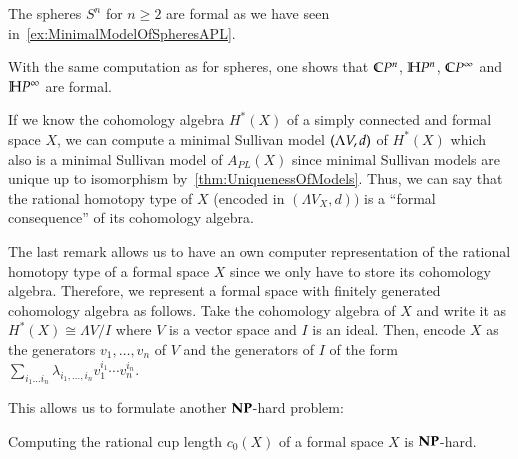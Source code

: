 \begin{Example}
 The spheres $S^n$ for $n \geq 2$ are formal as we have seen in~\ref{ex:MinimalModelOfSpheresAPL}. 
\end{Example}

\begin{Example}
With the same computation as for spheres, one shows that $\mathbb{C} P^n$, $\mathbb{H} P^n$,
$\mathbb{C} P^{\infty}$ and $\mathbb{H} P^{\infty}$ are formal.
\end{Example}


\begin{Remark}
 If we know the cohomology algebra $H^*(X)$ of a simply connected and formal space $X$, we can compute a minimal Sullivan model
 $(\Lambda V,d)$ of $H^*(X)$ which also is a minimal Sullivan model of $A_{PL}(X)$ since 
 minimal Sullivan models are unique up to isomorphism by~\ref{thm:UniquenessOfModels}. Thus, we can say
 that the rational homotopy type of $X$ (encoded in $(\Lambda V_X,d))$ is a ``formal consequence'' of its 
 cohomology algebra.
\end{Remark}

\begin{Remark}
\label{rem:EncodingOfFormalSpaces}
 The last remark allows us to have an own computer representation of the rational homotopy type of 
 a formal space $X$ since we only have to store its cohomology algebra. Therefore, we represent a 
 formal space with finitely generated cohomology algebra as follows. 
 Take the cohomology algebra of $X$ and write it as $H^*(X) \cong \Lambda V / I$ where $V$ is a vector
 space and $I$ is an ideal. Then, encode $X$ as the generators $v_1, \ldots, v_n$ of $V$ and the generators 
 of $I$ of the form $\sum_{i_1 \ldots i_n} \lambda_{i_1, \ldots , i_n} v_1^{i_1} \cdots v_n^{i_n}$.
\end{Remark}


This allows us to formulate another $\mathbf{NP}$-hard problem:

\begin{Theorem}
\label{thm:RationalCupLengthOfFormalSpacesIsNPHard}
 Computing the rational cup length $c_0 (X)$ of a formal space $X$ is $\mathbf{NP}$-hard.
\end{Theorem}


